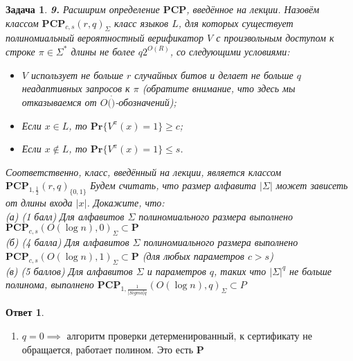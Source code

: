\documentclass[a4paper]{article}
\theoremstyle{plain}
\newtheorem*{task}{Задача}
\theoremstyle{definition}
\newtheorem*{answer}{Ответ}
\begin{document}
\begin{task}\textbf{9.}
Расширим определение $\mathbf{PCP}$, введённое на лекции. Назовём классом $\mathbf{PCP}_{c,s}(r,q)_\Sigma$ класс языков $L$, для которых существует полиномиальный вероятностный верификатор $V$ с произвольным доступом к строке $\pi \in \Sigma^*$ длины не более $q2^{O(R)}$, со следующими условиями:
\begin{itemize}
\item $V$ использует не больше $r$ случайных битов и делает не больше $q$ неадаптивных запросов к $\pi$ (обратите внимание, что здесь мы отказываемся от $O(\dot)$-обозначений);
\item Если $x \in L$, то $\mathbf{Pr}\{V^\pi (x) = 1\} \ge c$;
\item Если $x \notin L$, то $\mathbf{Pr}\{V^\pi (x) = 1\} \le s$.
\end{itemize}
Соответственно, класс, введённый на лекции, является классом $\mathbf{PCP}_{1, \frac{1}{2}}(r,q)_{\{0,1\}}$ Будем считать, что размер алфавита $|\Sigma|$ может зависеть от длины входа $|x|$. Докажите, что:\\
(а) (1 балл) Для алфавитов $\Sigma$ полиномиального размера выполнено  $\mathbf{PCP}_{c,s}(O(\log{n}), 0)_\Sigma \subset \mathbf{P}$ \\
(б) (4 балла) Для алфавитов $\Sigma$ полиномиального размера выполнено $\mathbf{PCP}_{c,s}(O(\log{n}), 1)_\Sigma \subset \mathbf{P}$ (для любых параметров $c > s$) \\
(в) (5 баллов) Для алфавитов $\Sigma$ и параметров $q$, таких что $|\Sigma|^q$ не больше полинома, выполнено $\mathbf{PCP}_{1, \frac{1}{|Sigma|q}}(O(\log{n}),q)_\Sigma \subset P$
\end{task}
\begin{answer}
\begin{enumerate}
    \item $q = 0 \implies $ алгоритм проверки детерменированный, к сертификату не обращается, работает полином. Это есть $\mathbf{P}$
\end{enumerate}
\end{answer}
\end{document}
